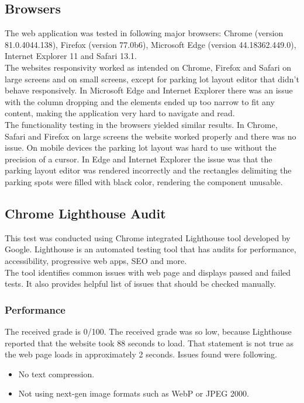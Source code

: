 \documentclass[thesis=M,english]{FITthesis}[2019/03/06]
\begin{document}
\subsection{Browsers}
The web application was tested in following major browsers: Chrome (version 81.0.4044.138), Firefox (version 77.0b6), Microsoft Edge (version 44.18362.449.0), Internet Explorer 11 and Safari 13.1.\\

The websites responsivity worked as intended on Chrome, Firefox and Safari on large screens and on small screens, except for parking lot layout editor that didn't behave responsively. In Microsoft Edge and Internet Explorer there was an issue with the column dropping and the elements ended up too narrow to fit any content, making the application very hard to navigate and read.\\

The functionality testing in the browsers yielded similar results. In Chrome, Safari and Firefox on large screens the website worked properly and there was no issue. On mobile devices the parking lot layout was hard to use without the precision of a cursor. In Edge and Internet Explorer the issue was that the parking layout editor was rendered incorrectly and the rectangles delimiting the parking spots were filled with black color, rendering the component unusable.\\

\subsection{Chrome Lighthouse Audit}
This test was conducted using Chrome integrated Lighthouse tool developed by Google. Lighthouse is an automated testing tool that has audits for performance, accessibility, progressive web apps, SEO and more.\\

The tool identifies common issues with web page and displays passed and failed tests. It also provides helpful list of issues that should be checked manually.

\subsubsection{Performance}
The received grade is 0/100. The received grade was so low, because Lighthouse reported that the website took 88 seconds to load. That statement is not true as the web page loads in approximately 2 seconds. Issues found were following.
\begin{itemize}
    \item No text compression.
    \item Not using next-gen image formats such as WebP or JPEG 2000.
\end{itemize}
\end{document}

